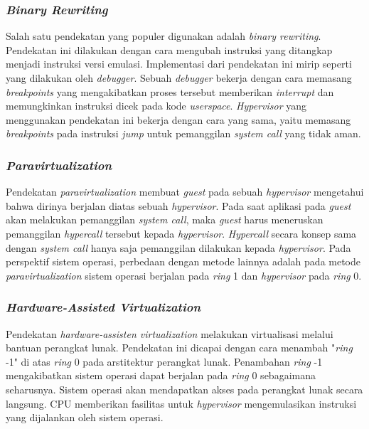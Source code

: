 \subsubsection{\textit{Binary Rewriting}}

Salah satu pendekatan yang populer digunakan adalah \textit{binary rewriting}. Pendekatan ini dilakukan dengan cara
mengubah instruksi yang ditangkap menjadi instruksi versi emulasi. Implementasi dari pendekatan ini mirip seperti yang
dilakukan oleh \textit{debugger}. Sebuah \textit{debugger} bekerja dengan cara memasang \textit{breakpoints} yang
mengakibatkan proses tersebut memberikan \textit{interrupt} dan memungkinkan instruksi dicek pada kode
\textit{userspace}. \textit{Hypervisor} yang menggunakan pendekatan ini bekerja dengan cara yang sama, yaitu memasang
\textit{breakpoints} pada instruksi \textit{jump} untuk pemanggilan \textit{system call} yang tidak aman.

\subsubsection{\textit{Paravirtualization}}

Pendekatan \textit{paravirtualization} membuat \textit{guest} pada sebuah \textit{hypervisor} mengetahui bahwa dirinya
berjalan diatas sebuah \textit{hypervisor}. Pada saat aplikasi pada \textit{guest} akan melakukan pemanggilan
\textit{system call}, maka \textit{guest} harus meneruskan pemanggilan \textit{hypercall} tersebut kepada
\textit{hypervisor}. \textit{Hypercall} secara konsep sama dengan \textit{system call} hanya saja pemanggilan dilakukan
kepada \textit{hypervisor}. Pada perspektif sistem operasi, perbedaan dengan metode lainnya adalah pada metode
\textit{paravirtualization} sistem operasi berjalan pada \textit{ring} 1 dan \textit{hypervisor} pada \textit{ring}
0.

\subsubsection{\textit{Hardware-Assisted Virtualization}}

Pendekatan \textit{hardware-assisten virtualization} melakukan virtualisasi melalui bantuan perangkat lunak. Pendekatan
ini dicapai dengan cara menambah "\textit{ring} -1" di atas \textit{ring} 0 pada arstitektur perangkat lunak. Penambahan
\textit{ring} -1 mengakibatkan sistem operasi dapat berjalan pada \textit{ring} 0 sebagaimana seharusnya. Sistem operasi
akan mendapatkan akses pada perangkat lunak secara langsung. CPU memberikan fasilitas untuk \textit{hypervisor}
mengemulasikan instruksi yang dijalankan oleh sistem operasi.

